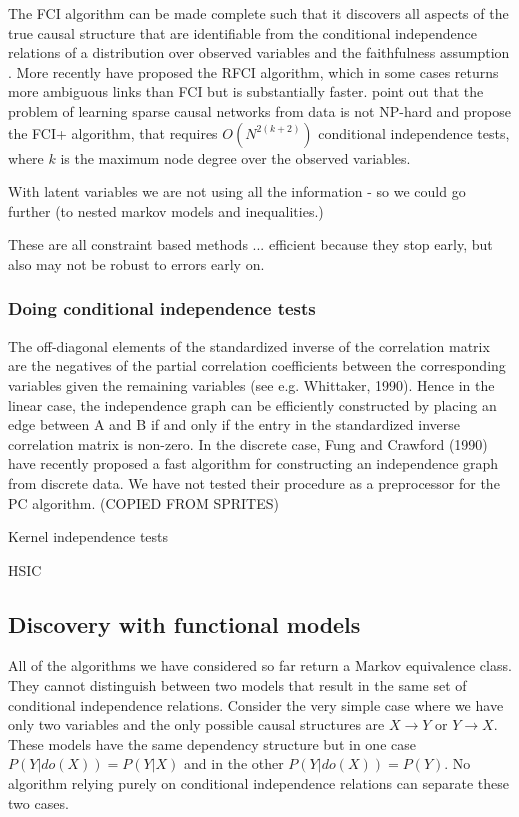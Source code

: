 \documentclass[11pt,a4paper]{article}
\begin{document}
The FCI algorithm can be made complete such that it discovers all aspects of the true causal structure that are identifiable from the conditional independence relations of a distribution over observed variables and the faithfulness assumption \cite{Zhang2008}. More recently \cite{Colombo2012} have proposed the RFCI algorithm, which in some cases returns more ambiguous links than FCI but is substantially faster. \cite{Claassen2013} point out that the problem of learning sparse causal networks from data is not NP-hard and propose the FCI+ algorithm, that requires $O(N^{2(k+2)})$ conditional independence tests, where $k$ is the maximum node degree over the observed variables. 

With latent variables we are not using all the information - so we could go further (to nested markov models and inequalities.) \cite{Richardson2012} \cite{Shipster2014}


These are all constraint based methods ... efficient because they stop early, but also may not be robust to errors early on. 



\subsubsection{Doing conditional independence tests}
The off-diagonal elements of the standardized inverse of the correlation
matrix are the negatives of the partial correlation coefficients between the corresponding
variables given the remaining variables (see e.g. Whittaker, 1990). Hence in the linear case, the
independence graph can be efficiently constructed by placing an edge between A and B if and
only if the entry in the standardized inverse correlation matrix is non-zero. In the discrete case,
Fung and Crawford (1990) have recently proposed a fast algorithm for constructing an
independence graph from discrete data. We have not tested their procedure as a preprocessor for
the PC algorithm. (COPIED FROM SPRITES)

\cite{Zhang2012} Kernel independence tests

HSIC \cite{Gretton2008}

\subsection{Discovery with functional models}
All of the algorithms we have considered so far return a Markov equivalence class. They cannot distinguish between two models that result in the same set of conditional independence relations. Consider the very simple case where we have only two variables and the only possible causal structures are $X \rightarrow Y$ or $Y \rightarrow X$. These models have the same dependency structure but in one case $P(Y|do(X)) = P(Y|X)$ and in the other $P(Y|do(X)) = P(Y)$. No algorithm relying purely on conditional independence relations can separate these two cases. 
\end{document}
